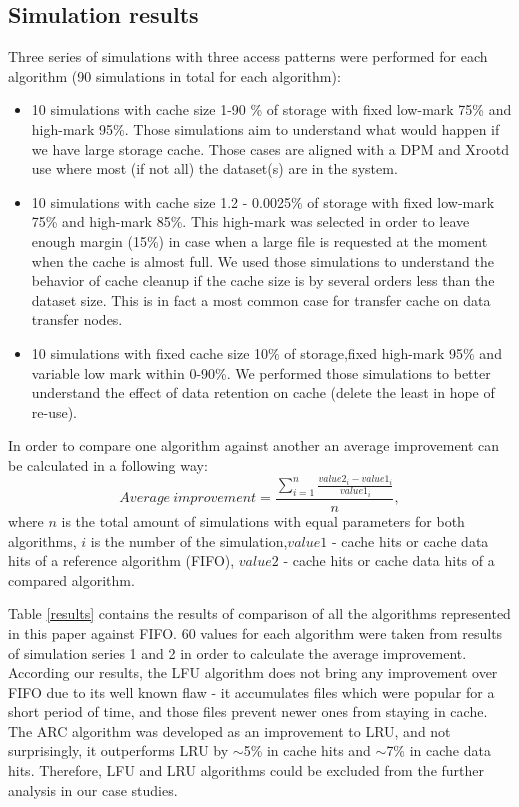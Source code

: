 \documentclass[english]{ddny}
\begin{document}
\subsection{Simulation results}
Three series of simulations with three access patterns were performed for each algorithm (90 simulations in total for each algorithm): 
\begin{itemize}
\item 10 simulations with cache size 1-90 \% of storage with fixed low-mark 75\% and high-mark 95\%. Those simulations aim to understand what would happen if we have large storage cache. Those cases are aligned with a DPM and Xrootd use where most (if not all) the dataset(s) are in the system.
\item 10 simulations with cache size 1.2 - 0.0025\% of storage with fixed low-mark 75\% and high-mark 85\%. This high-mark was selected in order to leave enough margin (15\%) in case when a large file is requested at the moment when the cache is almost full. We used those simulations to understand the behavior of cache cleanup if the cache size is by several orders less than the dataset size. This is in fact a most common case for transfer cache on data transfer nodes.
\item 10 simulations with fixed cache size 10\% of storage,fixed high-mark 95\% and  variable low mark  within 0-90\%. We performed those simulations to better understand the effect of data retention on cache (delete the least in hope of re-use).
\end{itemize}

In order to compare one algorithm against another an average improvement can be calculated in a following way:
\begin{equation}
Average~improvement = \frac{\sum^{n}_{i=1}\frac{value2_{i}-value1_{i}}{value1_{i}}}{n},
\end{equation}
where $n$ is the total amount of simulations with equal parameters for both algorithms, $i$ is the number of the simulation,$value1$ - cache hits or cache data hits of a reference algorithm (FIFO), $value2$ - cache hits or cache data hits of a compared algorithm.

Table \ref{results} contains the results of comparison of all the algorithms represented in this paper against FIFO. 60 values for each algorithm were taken from results of simulation series 1 and 2 in order to calculate the average improvement. According our results, the LFU algorithm does not bring any improvement over FIFO due to its well known flaw - it accumulates files which were popular for a short period of time, and those files prevent newer ones from staying in cache. The ARC algorithm was developed as an improvement to LRU, and not surprisingly, it outperforms LRU by $\sim$5\% in cache hits and $\sim$7\% in cache data hits. Therefore, LFU and LRU algorithms could be excluded from the further analysis in our case studies.
\end{document}
